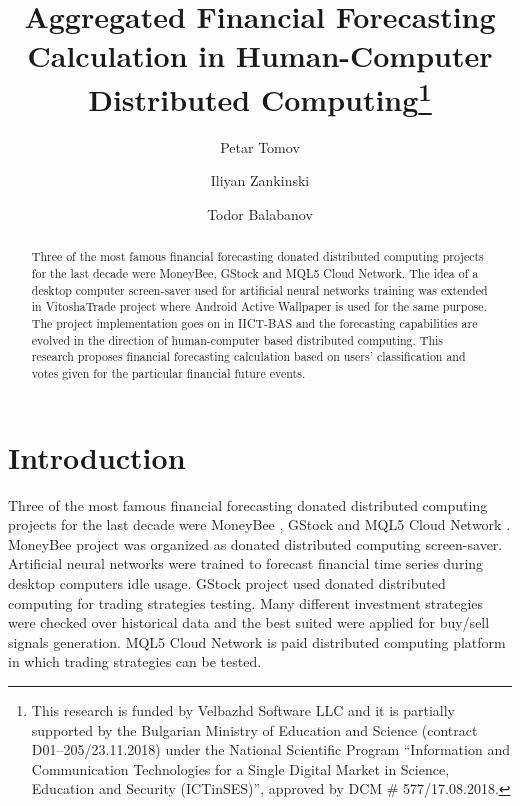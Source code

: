 \documentclass[runningheads]{llncs}
\begin{document}
%
\title{Aggregated Financial Forecasting Calculation in Human-Computer Distributed Computing\thanks{This research is funded by Velbazhd Software LLC and it is partially supported by the Bulgarian Ministry of Education and Science (contract D01–205/23.11.2018) under the National Scientific Program ``Information and Communication Technologies for a Single Digital Market in Science, Education and Security (ICTinSES)'', approved by DCM \# 577/17.08.2018.}}
%
%
\author{Petar Tomov \and Iliyan Zankinski \and Todor Balabanov}
%
%
%
\maketitle              %
%
\begin{abstract}
Three of the most famous financial forecasting donated distributed computing projects for the last decade were MoneyBee, GStock and MQL5 Cloud Network. The idea of a desktop computer screen-saver used for artificial neural networks training was extended in VitoshaTrade project where Android Active Wallpaper is used for the same purpose. The project implementation goes on in IICT-BAS and the forecasting capabilities are evolved in the direction of human-computer based distributed computing. This research proposes financial forecasting calculation based on users' classification and votes given for the particular financial future events. 

\end{abstract}
%
%
%
\section{Introduction}
%
Three of the most famous financial forecasting donated distributed computing projects for the last decade were MoneyBee \cite{money-bee-01}, GStock \cite{g-stock-01} and MQL5 Cloud Network \cite{mql5-cloud-network-01}. MoneyBee project was organized as donated distributed computing screen-saver. Artificial neural networks were trained to forecast financial time series during desktop computers idle usage. GStock project used donated distributed computing for trading strategies testing. Many different investment strategies were checked over historical data and the best suited were applied for buy/sell signals generation. MQL5 Cloud Network is paid distributed computing platform in which trading strategies can be tested. 
\end{document}
